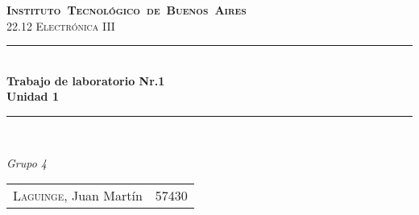 \begin{titlepage}

\newcommand{\HRule}{\rule{\linewidth}{0.5mm}}
\center
\mbox{\textsc{\LARGE \bfseries {Instituto Tecnol\'ogico de Buenos Aires}}}\\[1.5cm]
\textsc{\Large 22.12 Electr\'onica III}\\[0.5cm]

\HRule \\[0.6cm]
{ \Huge \bfseries Trabajo de laboratorio Nr.1
\\ Unidad 1}\\[0.4cm] %
\HRule \\[1.5cm]

{\large

\emph{Grupo 4}\\
\vspace{3px}

\begin{tabular}{lr} 	
\textsc{Laguinge}, Juan Mart\'in  & 57430 \\
\end{tabular}

\vspace{20px}

}

\vfill

\end{titlepage}